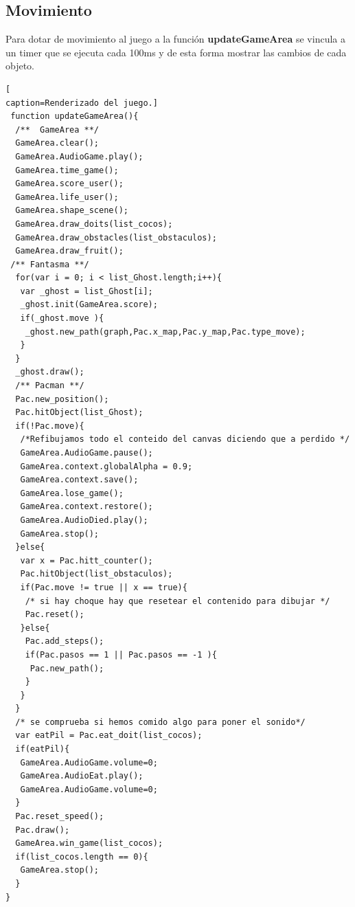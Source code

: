 \subsection{Movimiento}
Para dotar de movimiento al juego a la función \textbf{updateGameArea} se vincula a un timer que se ejecuta cada 100ms y de esta forma mostrar las cambios de cada objeto.
\begin{lstlisting}[
caption=Renderizado del juego.]
 function updateGameArea(){
  /**  GameArea **/   
  GameArea.clear();
  GameArea.AudioGame.play();
  GameArea.time_game();
  GameArea.score_user();
  GameArea.life_user();
  GameArea.shape_scene();
  GameArea.draw_doits(list_cocos);
  GameArea.draw_obstacles(list_obstaculos);
  GameArea.draw_fruit();
 /** Fantasma **/
  for(var i = 0; i < list_Ghost.length;i++){
   var _ghost = list_Ghost[i];
   _ghost.init(GameArea.score);
   if(_ghost.move ){
    _ghost.new_path(graph,Pac.x_map,Pac.y_map,Pac.type_move);
   }
  }
  _ghost.draw();
  /** Pacman **/
  Pac.new_position();
  Pac.hitObject(list_Ghost);
  if(!Pac.move){
   /*Refibujamos todo el conteido del canvas diciendo que a perdido */
   GameArea.AudioGame.pause();
   GameArea.context.globalAlpha = 0.9;
   GameArea.context.save();
   GameArea.lose_game();
   GameArea.context.restore();
   GameArea.AudioDied.play();
   GameArea.stop();
  }else{
   var x = Pac.hitt_counter();
   Pac.hitObject(list_obstaculos);
   if(Pac.move != true || x == true){
    /* si hay choque hay que resetear el contenido para dibujar */
    Pac.reset();
   }else{
    Pac.add_steps();
    if(Pac.pasos == 1 || Pac.pasos == -1 ){
     Pac.new_path();
    }
   }
  }
  /* se comprueba si hemos comido algo para poner el sonido*/
  var eatPil = Pac.eat_doit(list_cocos);
  if(eatPil){
   GameArea.AudioGame.volume=0;
   GameArea.AudioEat.play();
   GameArea.AudioGame.volume=0;
  }
  Pac.reset_speed();
  Pac.draw();
  GameArea.win_game(list_cocos);
  if(list_cocos.length == 0){
   GameArea.stop();
  }
}
 \end{lstlisting}
